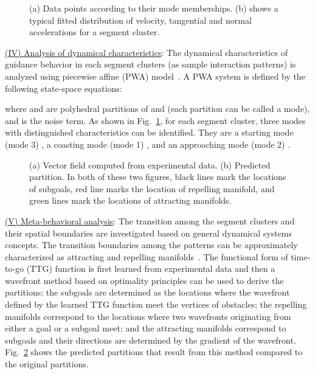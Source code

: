 \documentclass[journal]{IEEEtran}
\begin{document}
\begin{figure}[!t]
\centering
{}
\caption{(a) Data points according to their mode memberships. (b) shows a typical fitted distribution of velocity, tangential and normal accelerations for a segment cluster.} \label{fig:PWA_model}
\end{figure}

\underline{(IV) Analysis of dynamical characteristics}: The dynamical characteristics of guidance behavior in each segment clusters (as sample interaction patterns) is analyzed using piecewise affine (PWA) model~\cite{ferrari2003clustering}. A PWA system is defined by the following state-space equations:

where  and  are polyhedral partitions of  and  (each partition can be called a mode), and  is the noise term. As shown in Fig.~\ref{fig:PWA_model}, for each segment cluster, three modes with distinguished characteristics can be identified. They are a starting mode (mode 3) , a coasting mode (mode 1) , and an approaching mode (mode 2) .

\begin{figure}[!t]
\centering
{}
\caption{(a) Vector field computed from experimental data. (b) Predicted partition. In both of these two figures, black lines mark the locations of subgoals, red line marks the location of repelling manifold, and green lines mark the locations of attracting manifolds.} \label{fig:meta_analysis}
\end{figure}

\underline{(V) Meta-behavioral analysis}: The transition among the segment clusters and their spatial boundaries are investigated based on general dynamical systems concepts. The transition boundaries among the patterns can be approximately characterized as attracting and repelling manifolds~\cite{kong2011foundations,kong2011investigation}. The functional form of time-to-go (TTG) function is first learned from experimental data and then a wavefront method based on optimality principles can be used to derive the partitions: the subgoals are determined as the locations where the wavefront defined by the learned TTG function meet the vertices of obstacles; the repelling manifolds correspond to the locations where two wavefronts originating from either a goal or a subgoal meet; and the attracting manifolds correspond to subgoals and their directions are determined by the gradient of the wavefront. Fig.~\ref{fig:meta_analysis} shows the predicted partitions that result from this method compared to the original partitions. 
\end{document}
